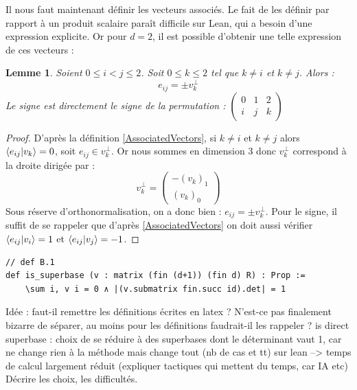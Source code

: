 \documentclass[12pt]{article}
\newtheorem{lemma}[theorem]{Lemme}
\numberwithin{equation}{section}
\begin{document}
Il nous faut maintenant définir les vecteurs associés. Le fait de les définir par rapport à un produit scalaire paraît difficile sur Lean, qui a besoin d'une expression explicite. Or pour $d=2$, il est possible d'obtenir une telle expression de ces vecteurs :
\begin{lemma}
\label{VectAssoc}
    Soient $0\leq i < j \leq 2$. Soit $0 \leq k \leq 2$ tel que $k\ne i $ et $k \ne j$. Alors :
    \begin{equation}
        e_{ij}= \pm v_k^{\perp}
    \end{equation}
    Le signe est directement le signe de la permutation : $
      \begin{pmatrix}
    0 & 1 & 2 \\
    i & j & k
  \end{pmatrix} $
\end{lemma}
\begin{proof}
    D'après la définition \ref{AssociatedVectors}, si $k\ne i $ et $k \ne j$ alors $\braket{e_{ij}}{ v_k } = 0$, soit $e_{ij} \in v_k^{\perp}$. Or nous sommes en dimension 3 donc $v_k^{\perp}$ correspond à la droite dirigée par :
    \begin{equation}
        v_k^{\perp} = \begin{pmatrix}
            - (v_k)_1 \\
              (v_k)_0
        \end{pmatrix}
    \end{equation}
    Sous réserve d'orthonormalisation, on a donc bien : $e_{ij}= \pm v_k^{\perp}$. Pour le signe, il suffit de se rappeler que d'après \ref{AssociatedVectors} on doit aussi vérifier  $\braket{e_{ij}}{ v_i } = 1$ et $\braket{e_{ij}}{ v_j } = - 1$.



\end{proof}
\begin{lstlisting}
// def B.1
def is_superbase (v : matrix (fin (d+1)) (fin d) R) : Prop :=
    \sum i, v i = 0 ∧ |(v.submatrix fin.succ id).det| = 1
\end{lstlisting}

Idée : faut-il remettre les définitions écrites en latex ? N'est-ce pas finalement bizarre de séparer, au moins pour les définitions faudrait-il les rappeler ?
is direct superbase : choix de se réduire à des superbases dont le déterminant vaut 1, car ne change rien à la méthode mais change tout (nb de cas et tt) sur lean --> temps de calcul largement réduit (expliquer tactiques qui mettent du temps, car IA etc)
Décrire les choix, les difficultés.
\end{document}
